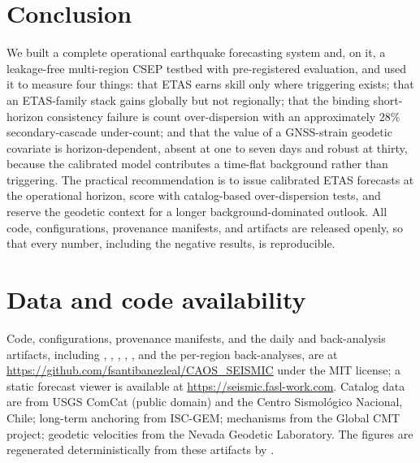 \documentclass[journal]{IEEEtran}
\begin{document}
\section{Conclusion}

We built a complete operational earthquake forecasting system and, on it, a leakage-free
multi-region CSEP testbed with pre-registered evaluation, and used it to measure four
things: that ETAS earns skill only where triggering exists; that an
ETAS-family stack gains globally but not regionally; that the binding short-horizon
consistency failure is count over-dispersion with an approximately $28\%$ secondary-cascade
under-count; and that the value of a GNSS-strain geodetic covariate is horizon-dependent,
absent at one to seven days and robust at thirty, because the calibrated model contributes a
time-flat background rather than triggering. The practical recommendation is to issue
calibrated ETAS forecasts at the operational horizon, score with catalog-based over-dispersion
tests, and reserve the geodetic context for a longer background-dominated outlook. All code,
configurations, provenance manifests, and artifacts are released openly, so that every number,
including the negative results, is reproducible.

\section*{Data and code availability}

{\raggedright
Code, configurations, provenance manifests, and the daily and back-analysis
artifacts, including , ,
, , , and
the per-region back-analyses, are at \url{https://github.com/fsantibanezleal/CAOS_SEISMIC} under
the MIT license; a static forecast viewer is available at \url{https://seismic.fasl-work.com}.
Catalog data are from USGS ComCat (public domain) and the Centro Sismol\'ogico Nacional, Chile;
long-term anchoring from ISC-GEM; mechanisms from the Global CMT project; geodetic velocities
from the Nevada Geodetic Laboratory. The figures are regenerated deterministically from these
artifacts by .\par}
\end{document}

